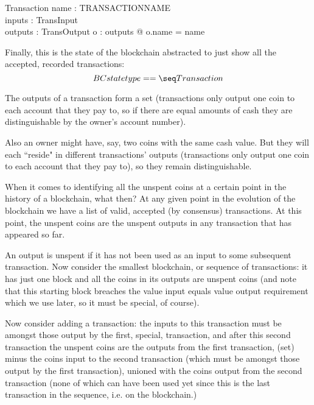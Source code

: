 \documentclass[11pt]{amsart}
\begin{document}
\begin{schema}{Transaction}
name : TRANSACTIONNAME\\
inputs : \power TransInput\\
outputs : \power TransOutput
\where
\forall o : outputs @ o.name = name
\end{schema}

Finally, this is the state of the blockchain abstracted to just show all the accepted, recorded transactions:
 \[
  BCstatetype == \seq Transaction
\]

 The outputs of a transaction form a set (transactions only output one coin to each account that they pay to, so if there are equal amounts of cash they are distinguishable by the owner's account number).
 
 Also an owner might have, say, two coins with the same cash value. But they will each ``reside" in different transactions' outputs (transactions only output one coin to each account that they pay to), so they remain distinguishable. 
 
 
When it comes to identifying all the unspent coins at a certain point in the history of a blockchain, what then? At any given point in the evolution of the blockchain we have a list of valid, accepted (by consensus) transactions. At this point, the unspent coins are the unspent outputs in any transaction that has appeared so far. 
 
An output is unspent if it has not been used as an input to some subsequent transaction. Now consider the smallest blockchain, or sequence of transactions: it has just one block and all the coins in its outputs are unspent coins (and note that this starting block breaches the value input equals value output requirement which we use later, so it must be special, of course). 
 
Now consider adding a transaction: the inputs to this transaction must be amongst those output by the first, special, transaction, and after this second transaction the unspent coins are the outputs from the first transaction, (set) minus the coins input to the second transaction (which must be amongst those output by the first transaction), unioned with the coins output from the second transaction (none of which can have been used yet since this is the last transaction in the sequence, i.e. on the blockchain.) 
 
\end{document}
